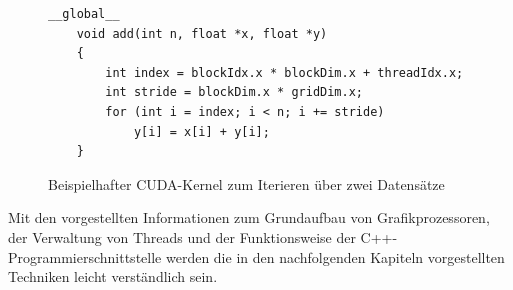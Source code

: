 \begin{figure}[ht]
	\begin{lstlisting}[language=MyC++]
	__global__
	void add(int n, float *x, float *y)
	{
		int index = blockIdx.x * blockDim.x + threadIdx.x;
		int stride = blockDim.x * gridDim.x;
		for (int i = index; i < n; i += stride)
			y[i] = x[i] + y[i];
	}
	\end{lstlisting}
	\caption{Beispielhafter CUDA-Kernel zum Iterieren über zwei Datensätze \cite{Harris2017}}
	\label{cuda_example}
\end{figure}

Mit den vorgestellten Informationen zum Grundaufbau von Grafikprozessoren, der Verwaltung von Threads und der Funktionsweise der C++-Programmierschnittstelle werden die in den nachfolgenden Kapiteln vorgestellten Techniken leicht verständlich sein.